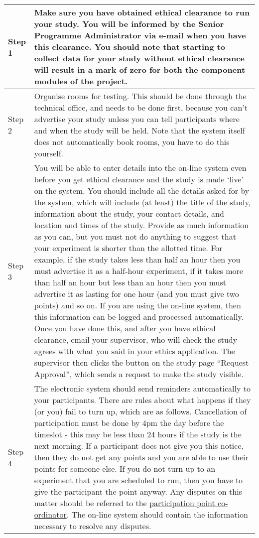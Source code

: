 \documentclass[
]{book}
\begin{document}
\begin{longtable}[]{@{}
  >{\raggedright\arraybackslash}p{}
  >{\raggedright\arraybackslash}p{}@{}}
\toprule\noalign{}
\begin{minipage}[b]{\linewidth}\raggedright
Step 1
\end{minipage} & \begin{minipage}[b]{\linewidth}\raggedright
Make sure you have obtained ethical clearance to run your study. You will be informed by the Senior Programme Administrator via e-mail when you have this clearance. You should note that starting to collect data for your study without ethical clearance will result in a mark of zero for both the component modules of the project.
\end{minipage} \\
\midrule\noalign{}
\endhead
\bottomrule\noalign{}
\endlastfoot
Step 2 & Organise rooms for testing. This should be done through the technical office, and needs to be done first, because you can't advertise your study unless you can tell participants where and when the study will be held. Note that the system itself does not automatically book rooms, you have to do this yourself. \\
Step 3 & You will be able to enter details into the on-line system even before you get ethical clearance and the study is made `live' on the system. You should include all the details asked for by the system, which will include (at least) the title of the study, information about the study, your contact details, and location and times of the study. Provide as much information as you can, but you must not do anything to suggest that your experiment is shorter than the allotted time. For example, if the study takes less than half an hour then you must advertise it as a half-hour experiment, if it takes more than half an hour but less than an hour then you must advertise it as lasting for one hour (and you must give two points) and so on. If you are using the on-line system, then this information can be logged and processed automatically. Once you have done this, and after you have ethical clearance, email your supervisor, who will check the study agrees with what you said in your ethics application. The supervisor then clicks the button on the study page ``Request Approval'', which sends a request to make the study visible. \\
Step 4 & The electronic system should send reminders automatically to your participants. There are rules about what happens if they (or you) fail to turn up, which are as follows. Cancellation of participation must be done by 4pm the day before the timeslot - this may be less than 24 hours if the study is the next morning. If a participant does not give you this notice, then they do not get any points and you are able to use their points for someone else. If you do not turn up to an experiment that you are scheduled to run, then you have to give the participant the point anyway. Any disputes on this matter should be referred to the \href{mailto:sonadmin.psy@plymouth.ac.uk}{participation point co-ordinator}. The on-line system should contain the information necessary to resolve any disputes. \\

\end{longtable}
\end{document}
